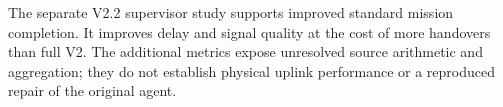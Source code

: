 The separate V2.2 supervisor study supports improved standard mission completion. It improves delay and signal quality at the cost of more handovers than full V2. The additional metrics expose unresolved source arithmetic and aggregation; they do not establish physical uplink performance or a reproduced repair of the original agent.
